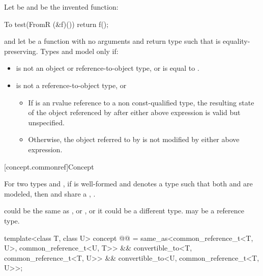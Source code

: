 \begin{itemdescr}
\pnum
Let  be  and
 be the invented function:
\begin{codeblock}
To test(FromR (&f)()) {
  return f();
}
\end{codeblock}
and let  be a function with no arguments and return type 
such that  is equality-preserving.
Types  and  model 
only if:

\begin{itemize}
\item
{} is not an object or reference-to-object type, or
 is equal to .

\item
{} is not a reference-to-object type, or

\begin{itemize}
\item
If  is an rvalue reference to a non const-qualified type, the
resulting state of the object referenced by  after either above
expression is valid but unspecified.

\item
Otherwise, the object referred to by  is not modified by either above
expression.
\end{itemize}
\end{itemize}
\end{itemdescr}


[concept.commonref]{Concept }

\pnum
For two types  and , if 
is well-formed and denotes a type  such that both
and
are modeled, then  and  share a
, .
\begin{note}
 could be the same as , or , or it could be a
different type.  may be a reference type.
\end{note}

\begin{itemdecl}
template<class T, class U>
  concept @@ =
    same_as<common_reference_t<T, U>, common_reference_t<U, T>> &&
    convertible_to<T, common_reference_t<T, U>> &&
    convertible_to<U, common_reference_t<T, U>>;
\end{itemdecl}

